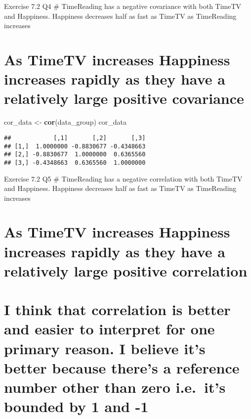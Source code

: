 \documentclass[
]{article}
\newenvironment{Shaded}{\begin{snugshade}}{\end{snugshade}}
\newcommand{\CommentTok}[1]{\textcolor[rgb]{0.56,0.35,0.01}{\textit{#1}}}
\newcommand{\FunctionTok}[1]{\textcolor[rgb]{0.13,0.29,0.53}{\textbf{#1}}}
\newcommand{\NormalTok}[1]{#1}
\newcommand{\OtherTok}[1]{\textcolor[rgb]{0.56,0.35,0.01}{#1}}
\newcommand{\SpecialCharTok}[1]{\textcolor[rgb]{0.81,0.36,0.00}{\textbf{#1}}}
\begin{document}
Exercise 7.2 Q4 \# TimeReading has a negative covariance with both
TimeTV and Happiness. Happiness decreases half as fast as TimeTV as
TimeReading increases

\section{As TimeTV increases Happiness increases rapidly as they have a
relatively large positive
covariance}\label{as-timetv-increases-happiness-increases-rapidly-as-they-have-a-relatively-large-positive-covariance}

\begin{Shaded}
\begin{Highlighting}[]
\NormalTok{cor\_data }\OtherTok{\textless{}{-}} \FunctionTok{cor}\NormalTok{(data\_group)}
\NormalTok{cor\_data}
\end{Highlighting}
\end{Shaded}

\begin{verbatim}
##            [,1]       [,2]       [,3]
## [1,]  1.0000000 -0.8830677 -0.4348663
## [2,] -0.8830677  1.0000000  0.6365560
## [3,] -0.4348663  0.6365560  1.0000000
\end{verbatim}

Exercise 7.2 Q5 \# TimeReading has a negative correlation with both
TimeTV and Happiness. Happiness decreases half as fast as TimeTV as
TimeReading increases

\section{As TimeTV increases Happiness increases rapidly as they have a
relatively large positive
correlation}\label{as-timetv-increases-happiness-increases-rapidly-as-they-have-a-relatively-large-positive-correlation}

\section{I think that correlation is better and easier to interpret for
one primary reason. I believe it's better because there's a reference
number other than zero i.e.~it's bounded by 1 and
-1}\label{i-think-that-correlation-is-better-and-easier-to-interpret-for-one-primary-reason.-i-believe-its-better-because-theres-a-reference-number-other-than-zero-i.e.-its-bounded-by-1-and--1}

\begin{Shaded}
\end{Shaded}
\end{document}
